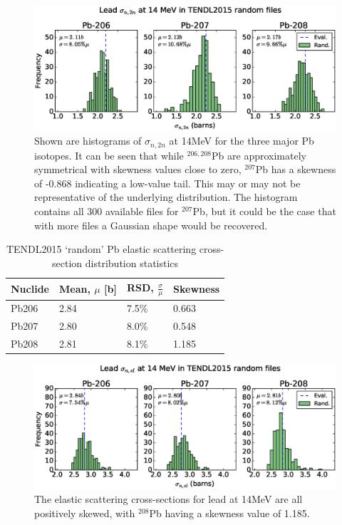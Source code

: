 \begin{figure}[ht]
	\includegraphics[width=\textwidth]{pb_tendl_n2n_hist}
	\caption{Shown are histograms of $\sigma_{n,2n}$ at 14MeV for the three major Pb isotopes. It can be seen that while $^{206,208}$Pb are approximately symmetrical with skewness values close to zero, $^{207}$Pb has a skewness of -0.868 indicating a low-value tail. This may or may not be representative of the underlying distribution. The histogram contains all 300 available files for $^{207}$Pb, but it could be the case that with more files a Gaussian shape would be recovered.}
	\label{fig:tendl_n2n}
\end{figure}

\begin{table}[ht]
  \footnotesize
  \centering 
  \begin{tabular}{llll}
    \toprule
    Nuclide & Mean, $\mu$ [b] & RSD, $\frac{\sigma}{\mu}$ & Skewness \\
    \midrule
    Pb206 & 2.84 & 7.5\% & 0.663 \\
    Pb207 & 2.80 & 8.0\% & 0.548 \\
    Pb208 & 2.81 & 8.1\% & 1.185 \\
    \bottomrule
  \end{tabular}
  \caption{TENDL2015 `random' Pb elastic scattering cross-section distribution statistics}
  \label{table:nel}
\end{table}

\begin{figure}[ht]
  \includegraphics[width=\textwidth]{pb_tendl_nel_hist}
  \caption{The elastic scattering cross-sections for lead at 14MeV are all positively skewed, with $^{208}$Pb having a skewness value of 1.185.}
  \label{fig:tendl_nel}
\end{figure}

